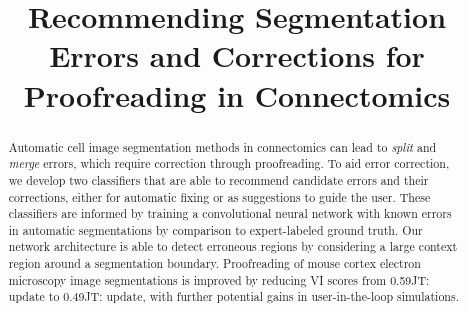 \documentclass{llncs}
\newcommand{\tnote}[3]{{\color{#2}#1: #3}}
\newcommand{\JT}[1]{\tnote{JT}{blue}{#1}}
\begin{document}
%
\title{Recommending Segmentation Errors and Corrections for Proofreading in Connectomics}
%
%
%
%
%

\maketitle              %

\begin{abstract}
Automatic cell image segmentation methods in connectomics can lead to \emph{split} and \emph{merge} errors, which require correction through proofreading. To aid error correction, we develop two classifiers that are able to recommend candidate errors and their corrections, either for automatic fixing or as suggestions to guide the user. These classifiers are informed by training a convolutional neural network with known errors in automatic segmentations by comparison to expert-labeled ground truth. Our network architecture is able to detect erroneous regions by considering a large context region around a segmentation boundary. Proofreading of mouse cortex electron microscopy image segmentations is improved by reducing VI scores from 0.59\JT{update} to 0.49\JT{update}, with further potential gains in user-in-the-loop simulations.
\end{abstract}
%

%


%


%
%


\end{document}

